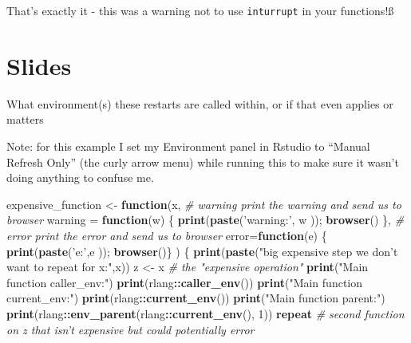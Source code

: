 \documentclass[]{book}
\newenvironment{Shaded}{\begin{snugshade}}{\end{snugshade}}
\newcommand{\CommentTok}[1]{\textcolor[rgb]{0.56,0.35,0.01}{\textit{#1}}}
\newcommand{\ControlFlowTok}[1]{\textcolor[rgb]{0.13,0.29,0.53}{\textbf{#1}}}
\newcommand{\DataTypeTok}[1]{\textcolor[rgb]{0.13,0.29,0.53}{#1}}
\newcommand{\DecValTok}[1]{\textcolor[rgb]{0.00,0.00,0.81}{#1}}
\newcommand{\KeywordTok}[1]{\textcolor[rgb]{0.13,0.29,0.53}{\textbf{#1}}}
\newcommand{\NormalTok}[1]{#1}
\newcommand{\OperatorTok}[1]{\textcolor[rgb]{0.81,0.36,0.00}{\textbf{#1}}}
\newcommand{\StringTok}[1]{\textcolor[rgb]{0.31,0.60,0.02}{#1}}
\begin{document}
That's exactly it - this was a warning not to use \texttt{inturrupt} in your functions!ß

\hypertarget{slides}{%
\section*{Slides}\label{slides}}

What environment(s) these restarts are called within, or if that even applies or matters

Note: for this example I set my Environment panel in Rstudio to ``Manual Refresh Only'' (the curly arrow menu) while running this to make sure it wasn't doing anything to confuse me.

\begin{Shaded}
\begin{Highlighting}[]
\NormalTok{expensive_function <-}\StringTok{ }\ControlFlowTok{function}\NormalTok{(x,}
                               \CommentTok{# warning print the warning and send us to browser}
                               \DataTypeTok{warning =} \ControlFlowTok{function}\NormalTok{(w) \{ }\KeywordTok{print}\NormalTok{(}\KeywordTok{paste}\NormalTok{(}\StringTok{'warning:'}\NormalTok{, w ));  }\KeywordTok{browser}\NormalTok{() \},}
                               \CommentTok{# error print the error and send us to browser}
                               \DataTypeTok{error=}\ControlFlowTok{function}\NormalTok{(e) \{ }\KeywordTok{print}\NormalTok{(}\KeywordTok{paste}\NormalTok{(}\StringTok{'e:'}\NormalTok{,e )); }\KeywordTok{browser}\NormalTok{()\} ) \{}
  \KeywordTok{print}\NormalTok{(}\KeywordTok{paste}\NormalTok{(}\StringTok{"big expensive step we don't want to repeat for x:"}\NormalTok{,x))}
\NormalTok{  z <-}\StringTok{ }\NormalTok{x  }\CommentTok{# the "expensive operation"}
  \KeywordTok{print}\NormalTok{(}\StringTok{"Main function caller_env:"}\NormalTok{)}
  \KeywordTok{print}\NormalTok{(rlang}\OperatorTok{::}\KeywordTok{caller_env}\NormalTok{())}
  \KeywordTok{print}\NormalTok{(}\StringTok{"Main function current_env:"}\NormalTok{)}
  \KeywordTok{print}\NormalTok{(rlang}\OperatorTok{::}\KeywordTok{current_env}\NormalTok{())}
  \KeywordTok{print}\NormalTok{(}\StringTok{"Main function parent:"}\NormalTok{)}
  \KeywordTok{print}\NormalTok{(rlang}\OperatorTok{::}\KeywordTok{env_parent}\NormalTok{(rlang}\OperatorTok{::}\KeywordTok{current_env}\NormalTok{(), }\DecValTok{1}\NormalTok{))}
  \ControlFlowTok{repeat}
  \CommentTok{# second function on z that isn't expensive but could potentially error}

\end{Highlighting}
\end{Shaded}
\end{document}
